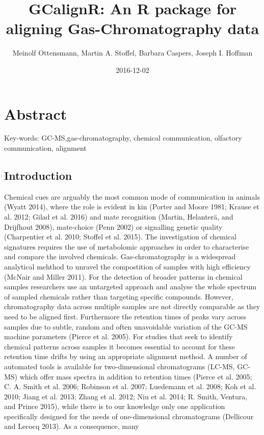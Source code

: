 \documentclass[]{article}
\title{GCalignR: An R package for aligning Gas-Chromatography data}
\author{Meinolf Ottensmann, Martin A. Stoffel, Barbara Caspers, Joseph I.
Hoffman}
\date{2016-12-02}
\begin{document}
\maketitle

\section{Abstract}\label{abstract}

Key-words: GC-MS,gas-chromatography, chemical communication, olfactory
communication, alignment

\subsection{Introduction}\label{introduction}

Chemical cues are arguably the most common mode of communication in
animals (Wyatt 2014), where the role is evident in kin (Porter and Moore
1981; Krause et al. 2012; Gilad et al. 2016) and mate recognition
(Martin, Helanterä, and Drijfhout 2008), mate-choice (Penn 2002) or
signalling genetic quality (Charpentier et al. 2010; Stoffel et al.
2015). The investigation of chemical signatures requires the use of
metabolomic approaches in order to characterise and compare the involved
chemicals. Gas-chromatography is a widespread analytical mehthod to
unravel the compostition of samples with high efficiency (McNair and
Miller 2011). For the detection of broader patterns in chemical samples
researchers use an untargeted approach and analyse the whole spectrum of
sampled chemicals rather than targeting specific compounds. However,
chromatography data across multiple samples are not directly comparable
as they need to be aligned first. Furthermore the retention times of
peaks vary across samples due to subtle, random and often unavoidable
variation of the GC-MS machine parameters (Pierce et al. 2005). For
studies that seek to identify chemical patterns across samples it
becomes essential to account for these retention time drifts by using an
appropriate alignment method. A number of automated tools is available
for two-dimensional chromatograms (LC-MS, GC-MS) which offer mass
spectra in addition to retention times (Pierce et al. 2005; C. A. Smith
et al. 2006; Robinson et al. 2007; Luedemann et al. 2008; Koh et al.
2010; Jiang et al. 2013; Zhang et al. 2012; Niu et al. 2014; R. Smith,
Ventura, and Prince 2015), while there is to our knowledge only one
application specifically designed for the needs of one-dimensional
chromatograms (Dellicour and Lecocq 2013). As a consequence, many
\end{document}
